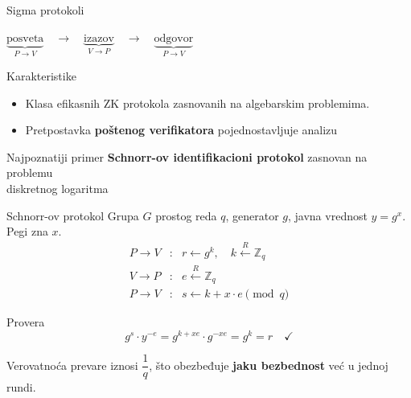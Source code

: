 ﻿\documentclass[aspectratio=1610]{beamer}
\newcommand{\keyword}[1]{\textcolor{wcprimary}{\textbf{#1}}}
\begin{document}
\begin{frame}{Sigma protokoli}
\vspace{6pt}
\begin{center}
\large
$\underbrace{\text{posveta}}_{P \to V}
\quad \longrightarrow \quad
\underbrace{\text{izazov}}_{V \to P}
\quad \longrightarrow \quad
\underbrace{\text{odgovor}}_{P \to V}$
\end{center}
\vspace{8pt}
\begin{block}{\normalsize Karakteristike}
  \begin{itemize}\itemsep6pt
    \item Klasa efikasnih ZK protokola zasnovanih na algebarskim problemima.
    \item Pretpostavka \keyword{poštenog verifikatora} pojednostavljuje analizu
  \end{itemize}
\end{block}
\vspace{6pt}
\begin{exampleblock}{\normalsize Najpoznatiji primer}
  \textbf{Schnorr-ov identifikacioni protokol} zasnovan na problemu\\ diskretnog logaritma
\end{exampleblock}
\end{frame}

\begin{frame}{Schnorr-ov protokol}
\vspace{6pt}
Grupa $G$ prostog reda $q$, generator $g$, javna vrednost $y = g^x$. Pegi zna $x$.
\vspace{10pt}
\[
  \begin{array}{rcl}
    P \to V & : & r \leftarrow g^k, \quad k \xleftarrow{R} \mathbb{Z}_q \\[10pt]
    V \to P & : & e \xleftarrow{R} \mathbb{Z}_q \\[10pt]
    P \to V & : & s \leftarrow k + x \cdot e \pmod{q}
  \end{array}
\]
\vspace{6pt}
\begin{block}{\normalsize Provera}
  \[
    g^s \cdot y^{-e} = g^{k+xe} \cdot g^{-xe} = g^k = r \quad \checkmark
  \]
\end{block}
\vspace{6pt}
{\small Verovatnoća prevare iznosi $\dfrac{1}{q}$, što obezbeđuje \keyword{jaku bezbednost} već u jednoj rundi.}
\end{frame}
\end{document}
